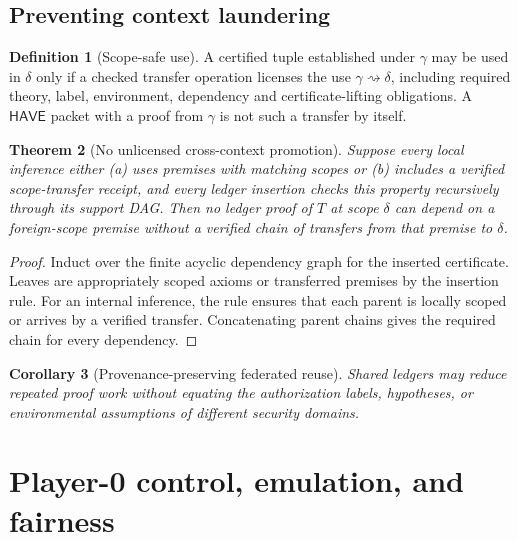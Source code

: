 \documentclass[11pt,letterpaper,oneside]{book}
\newtheorem{theorem}{Theorem}[chapter]
\newtheorem{corollary}[theorem]{Corollary}
\theoremstyle{definition}
\newtheorem{definition}[theorem]{Definition}
\theoremstyle{remark}
\begin{document}
\section{Preventing context laundering}
\begin{definition}[Scope-safe use]
A certified tuple established under $\gamma$ may be used in $\delta$
only if a checked transfer operation licenses the use
$\gamma\rightsquigarrow\delta$, including required theory,
label, environment, dependency and certificate-lifting obligations.
A $\mathsf{HAVE}$ packet with a proof from $\gamma$ is not such a
transfer by itself.
\end{definition}
\begin{theorem}[No unlicensed cross-context promotion]\label{thm:scope}
Suppose every local inference either (a) uses premises with matching
scopes or (b) includes a verified scope-transfer receipt, and every
ledger insertion checks this property recursively through its support
DAG. Then no ledger proof of $T$ at scope $\delta$ can depend on a
foreign-scope premise without a verified chain of transfers from that
premise to $\delta$.
\end{theorem}
\begin{proof}
Induct over the finite acyclic dependency graph for the inserted
certificate. Leaves are appropriately scoped axioms or transferred
premises by the insertion rule. For an internal inference, the rule
ensures that each parent is locally scoped or arrives by a verified
transfer. Concatenating parent chains gives the required chain for
every dependency.\end{proof}
\begin{corollary}[Provenance-preserving federated reuse]
Shared ledgers may reduce repeated proof work without equating the
authorization labels, hypotheses, or environmental assumptions of
different security domains.\end{corollary}

\chapter{Player-0 control, emulation, and fairness}
\end{document}

